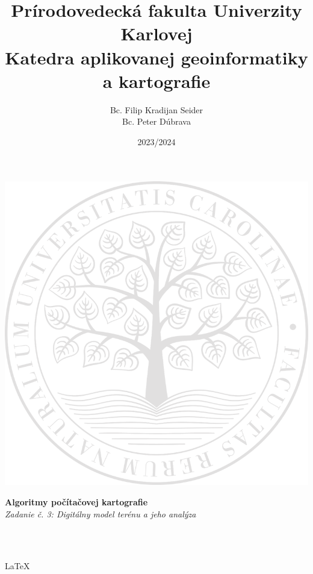 \documentclass[12pt]{article}
\title{Prírodovedecká fakulta Univerzity Karlovej \\ 
\Large Katedra aplikovanej geoinformatiky a kartografie}
\date{}
\begin{document}
\maketitle
\vspace*{-2cm}
\begin{center}
\includegraphics[scale=0.4]{latex/images/logo.png} 
\end{center}

\begin{center}
\textbf {Algoritmy počítačovej kartografie}\\
\textit{Zadanie č. 3: 	Digitálny model terénu a jeho analýza}\\
\vspace*{2cm}

\author {Bc. Filip Kradijan Seider\\Bc. Peter Dúbrava} \\
\date {2023/2024}
\\\LaTeX\
\end{center}
\thispagestyle{empty}

\newpage
\end{document}
